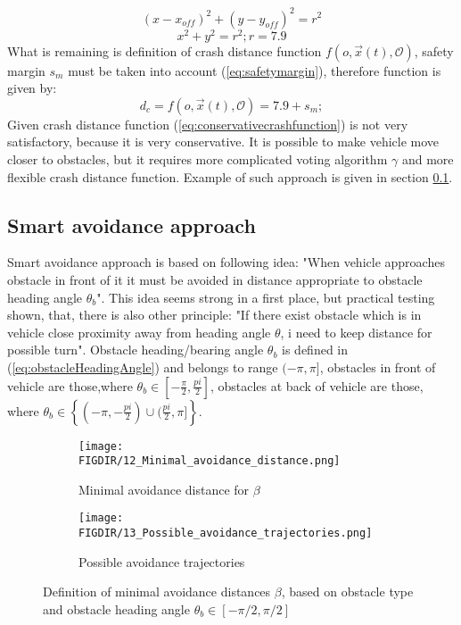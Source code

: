 \begin{equation}\label{eq:circlecommon}
    (x - x_{off})^2 + (y-y_{off})^2 = r^2
\end{equation}
\begin{equation}\label{eq:circleparam}
    x^2 + y^2 = r^2; r=7.9
\end{equation}
What is remaining is definition of crash distance function $f(o,\vec{x}(t),\mathscr{O})$, safety margin $s_m$ must be taken into account (\ref{eq:safetymargin}), therefore function is given by:
\begin{equation}\label{eq:conservativecrashfunction}
    d_c = f(o,\vec{x}(t),\mathscr{O}) = 7.9 + s_m;
\end{equation}
Given crash distance function (\ref{eq:conservativecrashfunction}) is not very satisfactory, because it is very conservative. It is possible to make vehicle move closer to obstacles, but it requires more complicated voting algorithm $\gamma$ and more flexible crash distance function. Example of such approach is given in  section \ref{sec:smartinvariance}.

\subsection{Smart avoidance approach}\label{sec:smartinvariance}
Smart avoidance approach is based on following idea: "When vehicle approaches obstacle in front of it it must be avoided in distance appropriate to obstacle heading angle $\theta_b$". This idea seems strong in a first place, but practical testing shown, that, there is also other principle: "If there exist obstacle which is in vehicle close proximity away from heading angle $\theta$, i need to keep distance for possible turn". Obstacle heading/bearing angle $\theta_b$ is defined in (\ref{eq:obstacleHeadingAngle}) and belongs to range $(-\pi,\pi]$, obstacles in front of vehicle are those,where $\theta_b\in[-\frac{\pi}{2},\frac{pi}{2}]$, obstacles at back of vehicle are those, where $\theta_b \in \left\{(-\pi,-\frac{pi}{2})\cup(\frac{pi}{2},\pi]\right\}$.

\begin{figure}[H]
    \begin{subfigure}{0.5\textwidth}
    \texttt{[image: \\FIGDIR/12\_Minimal\_avoidance\_distance.png]} 
    \caption{Minimal avoidance distance for $\beta$}
    \label{fig:MinimalAvoidanceDistance}
    \end{subfigure}
    \begin{subfigure}{0.5\textwidth}
    \texttt{[image: \\FIGDIR/13\_Possible\_avoidance\_trajectories.png]}
    \caption{Possible avoidance trajectories}
    \label{fig:PossibleAvoidanceTrajectories}
    \end{subfigure}
\caption{Definition of minimal avoidance distances $\beta$, based on obstacle type and obstacle heading angle $\theta_b \in [-\pi/2,\pi/2]$}
\label{fig:MinimalAvoidanceDistancesSmart}
\end{figure}


